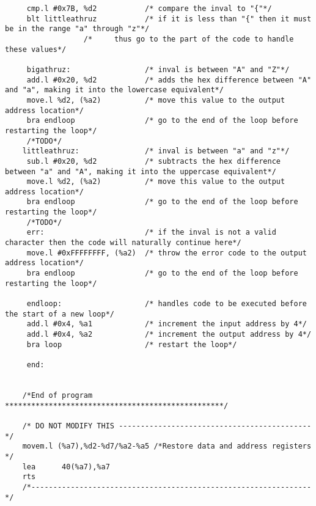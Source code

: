 \documentclass[letterpaper]{article}
\begin{document}
\begin{lstlisting}
     cmp.l #0x7B, %d2 			/* compare the inval to "{"*/
     blt littleathruz			/* if it is less than "{" then it must be in the range "a" through "z"*/
                  /*	 thus go to the part of the code to handle these values*/

     bigathruz:					/* inval is between "A" and "Z"*/
     add.l #0x20, %d2			/* adds the hex difference between "A" and "a", making it into the lowercase equivalent*/
     move.l %d2, (%a2)			/* move this value to the output address location*/
     bra endloop				/* go to the end of the loop before restarting the loop*/
     /*TODO*/
    littleathruz:				/* inval is between "a" and "z"*/
     sub.l #0x20, %d2			/* subtracts the hex difference between "a" and "A", making it into the uppercase equivalent*/
     move.l %d2, (%a2)			/* move this value to the output address location*/
     bra endloop				/* go to the end of the loop before restarting the loop*/
     /*TODO*/
     err:						/* if the inval is not a valid character then the code will naturally continue here*/
     move.l #0xFFFFFFFF, (%a2) 	/* throw the error code to the output address location*/
     bra endloop				/* go to the end of the loop before restarting the loop*/

     endloop:					/* handles code to be executed before the start of a new loop*/
     add.l #0x4, %a1 			/* increment the input address by 4*/
     add.l #0x4, %a2 			/* increment the output address by 4*/
     bra loop					/* restart the loop*/

     end:


    /*End of program **************************************************/

    /* DO NOT MODIFY THIS --------------------------------------------*/
    movem.l (%a7),%d2-%d7/%a2-%a5 /*Restore data and address registers */
    lea      40(%a7),%a7
    rts
    /*----------------------------------------------------------------*/

    \end{lstlisting}
\end{document}
